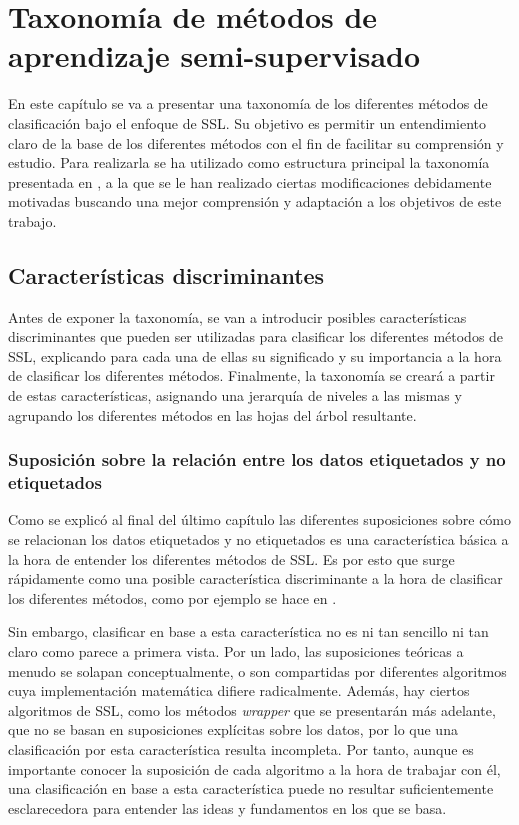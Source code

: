 \chapter{Taxonomía de métodos de aprendizaje semi-supervisado}
\label{cap:taxonomy}

En este capítulo se va a presentar una taxonomía de los diferentes métodos de clasificación bajo el enfoque de \gls{SSL}. Su objetivo es permitir un entendimiento claro de la base de los diferentes métodos con el fin de facilitar su comprensión y estudio. Para realizarla se ha utilizado como estructura principal la taxonomía presentada en \citet{van2020survey}, a la que se le han realizado ciertas modificaciones debidamente motivadas buscando una mejor comprensión y adaptación a los objetivos de este trabajo.

\section{Características discriminantes}

Antes de exponer la taxonomía, se van a introducir posibles características discriminantes que pueden ser utilizadas para clasificar los diferentes métodos de \gls{SSL}, explicando para cada una de ellas su significado y su importancia a la hora de clasificar los diferentes métodos. Finalmente, la taxonomía se creará a partir de estas características, asignando una jerarquía de niveles a las mismas y agrupando los diferentes métodos en las hojas del árbol resultante.

\subsection{Suposición sobre la relación entre los datos etiquetados y no etiquetados}
\label{sec:div-x-suposiciones}

Como se explicó al final del último capítulo las diferentes suposiciones sobre cómo se relacionan los datos etiquetados y no etiquetados es una característica básica a la hora de entender los diferentes métodos de \gls{SSL}. Es por esto que surge rápidamente como una posible característica discriminante a la hora de clasificar los diferentes métodos, como por ejemplo se hace en \citet{10.7551/mitpress/9780262033589.001.0001}.

Sin embargo, clasificar en base a esta característica no es ni tan sencillo ni tan claro como parece a primera vista. Por un lado, las suposiciones teóricas a menudo se solapan conceptualmente, o son compartidas por diferentes algoritmos cuya implementación matemática difiere radicalmente. Además, hay ciertos algoritmos de \gls{SSL}, como los métodos \textit{wrapper} que se presentarán más adelante, que no se basan en suposiciones explícitas sobre los datos, por lo que una clasificación por esta característica resulta incompleta.  Por tanto, aunque es importante conocer la suposición de cada algoritmo a la hora de trabajar con él, una clasificación en base a esta característica puede no resultar suficientemente esclarecedora para entender las ideas y fundamentos en los que se basa.

